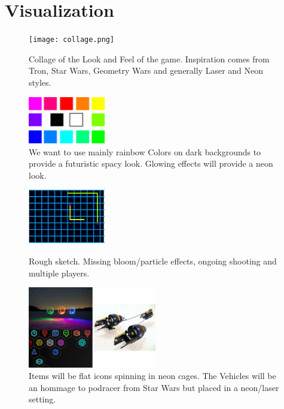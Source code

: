 \documentclass[10pt,a4paper]{article}
\begin{document}
\section{Visualization}


\begin{figure}[H]
  \centering
  \texttt{[image: collage.png]}
  \caption{Collage of the Look and Feel of the game. Inspiration comes from Tron, Star Wars, Geometry Wars and generally Laser and Neon styles.}
  \label{fig:figure1}
\end{figure}

\begin{figure}[H]
  \centering
  \includegraphics[width=0.3\textwidth]{colorpalette2.png}
  \caption{We want to use mainly rainbow Colors on dark backgrounds to provide a futuristic spacy look. Glowing effects will provide a neon look.}
  \label{fig:figure2}
\end{figure}

\begin{figure}[H]
  \centering
  \includegraphics[width=0.3\textwidth]{sketch.png}
  \label{fig:figure3}
  \caption{Rough sketch. Missing bloom/particle effects, ongoing shooting and multiple players.}
\end{figure}

\begin{figure}[H]
  \centering
  \includegraphics[width=0.5\textwidth]{itemslook.png}
  \caption{Items will be flat icons spinning in neon cages. The Vehicles will be an hommage to podracer from Star Wars but placed in a neon/laser setting.}
  \label{fig:figure4}
\end{figure}
\end{document}
